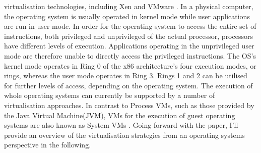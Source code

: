 virtualisation technologies, including Xen and VMware
\cite{citation_8}. \newline \newline
In a physical computer, the operating system is usually
operated in kernel mode while user applications are run in
user mode. In order for the operating system to access the
entire set of instructions, both privileged and unprivileged
of the actual processor, processors have different levels of
execution. Applications operating in the unprivileged user
mode are therefore unable to directly access the
privileged instructions. The OS's kernel mode operates in
Ring 0 of the x86 architecture's four execution modes, or
rings, whereas the user mode operates in Ring 3. Rings 1
and 2 can be utilised for further levels of access,
depending on the operating system. \newline \newline
The execution of whole operating systems can currently
be supported by a number of virtualisation approaches. In
contrast to Process VMs, such as those provided by the
Java Virtual Machine(JVM), VMs for the execution of
guest operating systems are also known as System VMs
\cite{citation_10}. Going forward with the paper, I’ll provide an
overview of the virtualisation strategies from an operating
systems perspective in the following.
